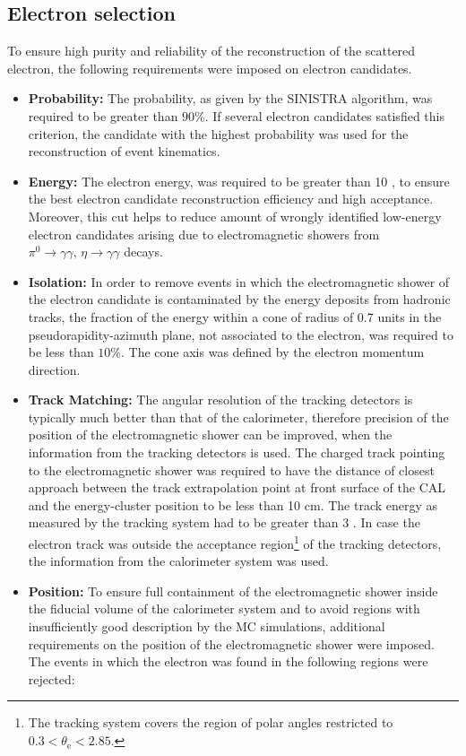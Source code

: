 \subsection{Electron selection}
\label{subsec:eleselect}

To ensure high purity and reliability of the reconstruction of the scattered electron, the following requirements were imposed on electron candidates.
\begin{itemize}
	\item \textbf{Probability:} The probability, as given by the SINISTRA algorithm, was required to be greater than $90\%$. If several electron candidates satisfied this criterion, the candidate with the highest probability was used for the reconstruction of event kinematics.
	\item \textbf{Energy:} The electron energy, \eefin was required to be greater than 10 \GeV, to ensure the best electron candidate reconstruction efficiency and high acceptance. Moreover, this cut helps to reduce amount of wrongly identified low-energy electron candidates arising due to electromagnetic showers from $\pi^0\rightarrow\gamma\gamma,\, \eta\rightarrow\gamma\gamma$ decays.
	\item \textbf{Isolation:} In order to remove events in which the electromagnetic shower of the electron candidate is contaminated by the energy deposits from hadronic tracks, the fraction of the energy within a cone of radius of 0.7 units in the pseudorapidity-azimuth plane, not associated to the electron, was required to be less than $10\%$. The cone axis was defined by the electron momentum direction.
	\item \textbf{Track Matching:} The angular resolution of the tracking detectors is typically much better than that of the calorimeter, therefore precision of the position of the electromagnetic shower can be improved, when the information from the tracking detectors is used. The charged track pointing to the electromagnetic shower was required to have the distance of closest approach between the track extrapolation point at front surface of the CAL and the energy-cluster position to be less than 10 cm. The track energy as measured by the tracking system had to be greater than 3 \GeV. In case the electron track was outside the acceptance region\footnote{The tracking system covers the region of polar angles restricted to $0.3 < \theta_\text{e} < 2.85$. } of the tracking detectors, the information from the calorimeter system was used.
	\item \textbf{Position:} To ensure full containment of the electromagnetic shower inside the fiducial volume of the calorimeter system and to avoid regions with insufficiently good description by the MC simulations, additional requirements on the position of the electromagnetic shower were imposed. The events in which the electron was found in the following regions were rejected:

\end{itemize}
